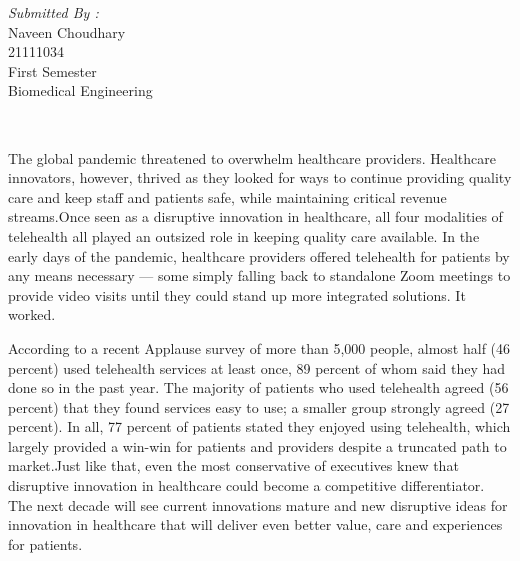 \documentclass[12pt]{article}
\begin{document}
\begin{titlepage}
\begin{minipage}{0.4\textwidth}
			\begin{flushright} \large
			\emph{Submitted By :} \\
			Naveen Choudhary\\
            21111034\\
        First Semester\\
        Biomedical Engineering\\
		\end{flushright}
        
	\end{minipage}\\[2 cm]
	

\end{titlepage}

\newpage

The global pandemic threatened to overwhelm healthcare providers. Healthcare innovators, however, thrived as they looked for ways to continue providing quality care and keep staff and patients safe, while maintaining critical revenue streams.Once seen as a disruptive innovation in healthcare, all four modalities of telehealth all played an outsized role in keeping quality care available. In the early days of the pandemic, healthcare providers offered telehealth for patients by any means necessary — some simply falling back to standalone Zoom meetings to provide video visits until they could stand up more integrated solutions. It worked.

\indent

According to a recent Applause survey of more than 5,000 people, almost half (46 percent) used telehealth services at least once, 89 percent of whom said they had done so in the past year. The majority of patients who used telehealth agreed (56 percent) that they found services easy to use; a smaller group strongly agreed (27 percent). In all, 77 percent of patients stated they enjoyed using telehealth, which largely provided a win-win for patients and providers despite a truncated path to market.Just like that, even the most conservative of executives knew that disruptive innovation in healthcare could become a competitive differentiator. The next decade will see current innovations mature and new disruptive ideas for innovation in healthcare that will deliver even better value, care and experiences for patients.

\indent
\end{document}
